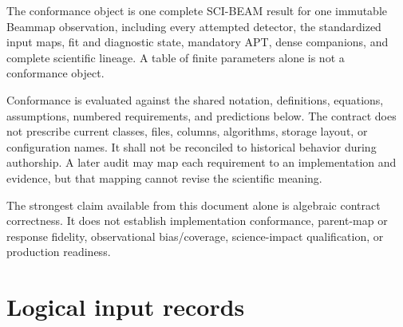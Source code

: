\documentclass[10pt]{article}
\begin{document}
The conformance object is one complete SCI-BEAM result for one immutable
Beammap observation, including every attempted detector, the standardized
input maps, fit and diagnostic state, mandatory APT, dense companions, and
complete scientific lineage. A table of finite parameters alone is not a
conformance object.

Conformance is evaluated against the shared notation, definitions, equations,
assumptions, numbered requirements, and predictions below. The contract does
not prescribe current classes, files, columns, algorithms, storage layout, or
configuration names. It shall not be reconciled to historical behavior during
authorship. A later audit may map each requirement to an implementation and
evidence, but that mapping cannot revise the scientific meaning.

The strongest claim available from this document alone is algebraic contract
correctness. It does not establish implementation conformance, parent-map or
response fidelity, observational bias/coverage, science-impact qualification,
or production readiness.

\section{Logical input records}
\end{document}
